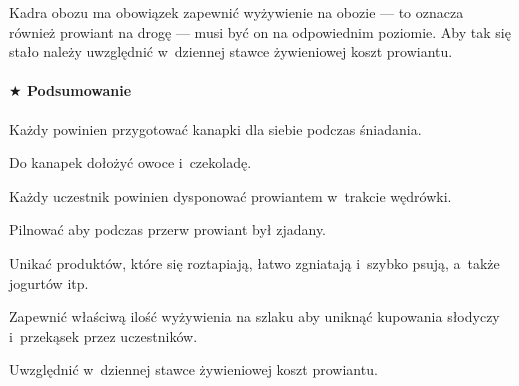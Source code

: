 \documentclass[a5paper,10pt,titlepage,twoside]{article}
\newcommand*{\thecheckbox}{\hss$\Box$} %
\newenvironment*{checklist}
{\list{}{%
\renewcommand*{\makelabel}[1]{\thecheckbox}}}
{\endlist}
\begin{document}
Kadra obozu ma obowiązek zapewnić wyżywienie na obozie --- to oznacza również prowiant na drogę --- musi być on na odpowiednim poziomie. Aby tak się stało należy uwzględnić w~dziennej stawce żywieniowej koszt prowiantu.
\paragraph{$\bigstar$ Podsumowanie}
\begin{checklist}
\item Każdy powinien przygotować kanapki dla siebie podczas śniadania.
\item Do kanapek dołożyć owoce i~czekoladę.
\item Każdy uczestnik powinien dysponować prowiantem w~trakcie wędrówki.
\item Pilnować aby podczas przerw prowiant był zjadany.
\item Unikać produktów, które się roztapiają, łatwo zgniatają i~szybko psują, a~także jogurtów itp.
\item Zapewnić właściwą ilość wyżywienia na szlaku aby uniknąć kupowania słodyczy i~przekąsek przez uczestników.
\item Uwzględnić w~dziennej stawce żywieniowej koszt prowiantu.
\end{checklist}
\end{document}
